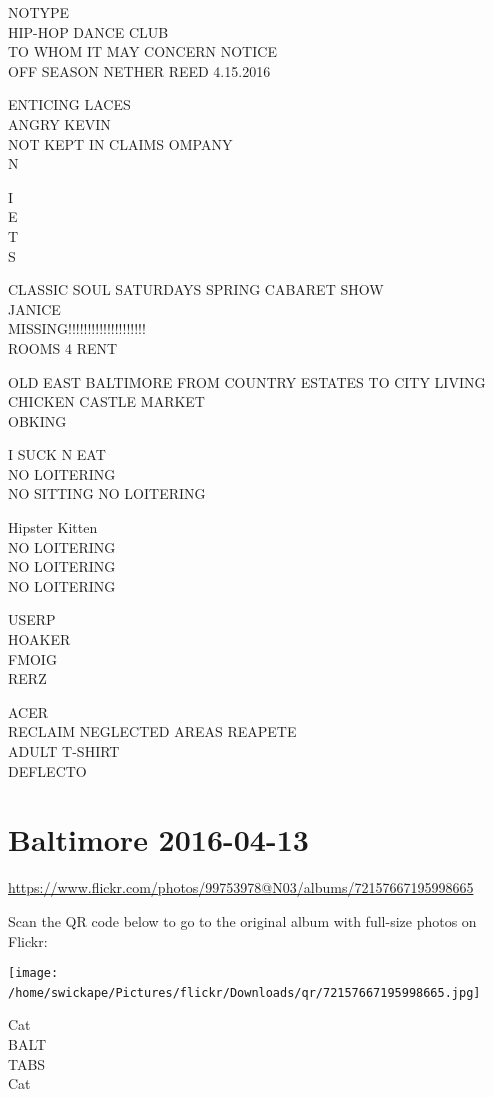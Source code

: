 \documentclass[10pt,letterpaper]{article}
\begin{document}
NOTYPE\\
HIP{-}HOP DANCE CLUB\\
TO WHOM IT MAY CONCERN NOTICE\\
OFF SEASON NETHER REED 4.15.2016

ENTICING LACES\\
ANGRY KEVIN\\
NOT KEPT IN CLAIMS OMPANY\\
N

I\\
E\\
T\\
S

CLASSIC SOUL SATURDAYS SPRING CABARET SHOW\\
JANICE\\
MISSING!!!!!!!!!!!!!!!!!!!!\\
ROOMS 4 RENT

OLD EAST BALTIMORE FROM COUNTRY ESTATES TO CITY LIVING\\
CHICKEN CASTLE MARKET\\
OBKING

I SUCK N EAT\\
NO LOITERING\\
NO SITTING NO LOITERING

Hipster Kitten\\
NO LOITERING\\
NO LOITERING\\
NO LOITERING

USERP\\
HOAKER\\
FMOIG\\
RERZ

ACER\\
RECLAIM NEGLECTED AREAS REAPETE\\
ADULT T{-}SHIRT\\
DEFLECTO
\

\section*{Baltimore 2016-04-13}

\url{https://www.flickr.com/photos/99753978@N03/albums/72157667195998665}

Scan the QR code below to go to the original album with full-size photos on Flickr:

\texttt{[image: /home/swickape/Pictures/flickr/Downloads/qr/72157667195998665.jpg]}
\

Cat\\
BALT\\
TABS\\
Cat
\end{document}
